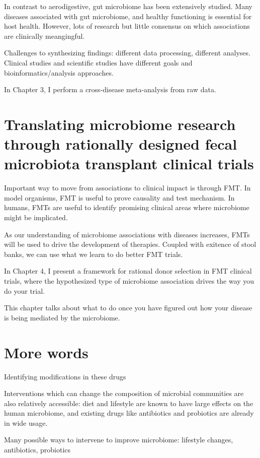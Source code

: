 In contrast to aerodigestive, gut microbiome has been extensively studied. Many diseases associated with gut microbiome, and healthy functioning is essential for host health. However, lots of research but little consensus on which associations are clinically meangingful.

Challenges to synthesizing findings: different data processing, different analyses. Clinical studies and scientific studies have different goals and bioinformatics/analysis approaches.

In Chapter 3, I perform a cross-disease meta-analysis from raw data.

\section{Translating microbiome research through rationally designed fecal microbiota transplant clinical trials}

Important way to move from associations to clinical impact is through FMT. In model organisms, FMT is useful to prove causality and test mechanism. In humans, FMTs are useful to identify promising clinical areas where microbiome might be implicated.

As our understanding of microbiome associations with diseases increases, FMTs will be used to drive the development of therapies. Coupled with exitence of stool banks, we can use what we learn to do better FMT trials.

In Chapter 4, I present a framework for rational donor selection in FMT clinical trials, where the hypothesized type of microbiome association drives the way you do your trial.

This chapter talks about what to do once you have figured out how your disease is being mediated by the microbiome.

\section{More words}

Identifying modifications in these drugs

Interventions which can change the composition of microbial communities are also relatively accessible: diet and lifestyle are known to have large effects on the human microbiome, and existing drugs like antibiotics and probiotics are already in wide usage.

Many possible ways to intervene to improve microbiome: lifestyle changes, antibiotics, probiotics

